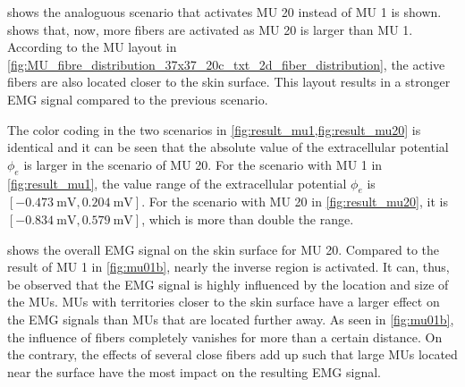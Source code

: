  shows the analoguous scenario that activates MU 20 instead of MU 1 is shown.  shows that, now, more fibers are activated as MU 20 is larger than MU 1. According to the MU layout in \cref{fig:MU_fibre_distribution_37x37_20c_txt_2d_fiber_distribution}, the active fibers are also located closer to the skin surface. This layout results in a stronger EMG signal compared to the previous scenario. 

The color coding in the two scenarios in \cref{fig:result_mu1,fig:result_mu20} is identical and it can be seen that the absolute value of the extracellular potential $\phi_e$ is larger in the scenario of MU 20. For the scenario with MU 1 in \cref{fig:result_mu1}, the value range of the extracellular potential $\phi_e$ is $[\SI{-0.473}{\milli\volt}, \SI{0.204}{\milli\volt}]$. For the scenario with MU 20 in \cref{fig:result_mu20}, it is $[\SI{-0.834}{\milli\volt}, \SI{0.579}{\milli\volt}]$, which is more than double the range.

 shows the overall EMG signal on the skin surface for MU 20. Compared to the result of MU 1 in \cref{fig:mu01b}, nearly the inverse region is activated. It can, thus, be observed that the EMG signal is highly influenced by the location and size of the MUs. MUs with territories closer to the skin surface have a larger effect on the EMG signals than MUs that are located further away. As seen in \cref{fig:mu01b}, the influence of fibers completely vanishes for more than a certain distance. On the contrary, the effects of several close fibers add up such that large MUs located near the surface have the most impact on the resulting EMG signal.

